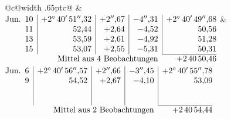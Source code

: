 \noindent\begin{tabular}{@{}c@{\hspace{.4em}\vrule width .65pt\hspace{.4em}}c@{}}
 &
 \\[.18ex]
\(\begin{array}[t]{@{}r|r|r|r|r@{}}
\text{Jun.}\enspace 10 & +2^\circ\,40'\,51''{,}32 & +2''{,}67 & -4''{,}31 & +2^\circ\,40'\,49''{,}68\\
11 & 52{,}44 & +2{,}64 & -4{,}52 & 50{,}56\\
13 & 53{,}59 & +2{,}61 & -4{,}92 & 51{,}28\\
15 & 53{,}07 & +2{,}55 & -5{,}31 & 50{,}31\\
\cline{5-5}
\multicolumn{4}{r}{\text{Mittel aus 4 Beobachtungen}} & +2\,40\,50{,}46
\end{array}\)
&
\(\begin{array}[t]{@{}r|r|r|r|r@{}}
\text{Jun.}\enspace 6 & +2^\circ\,40'\,56''{,}57 & +2''{,}66 & -3''{,}45 & +2^\circ\,40'\,55''{,}78\\
9 & 54{,}52 & +2{,}67 & -4{,}10 & 53{,}09\\
 & & & & \\
 & & & & \\
\cline{5-5}
\multicolumn{4}{r}{\text{Mittel aus 2 Beobachtungen}} & +2\,40\,54{,}44
\end{array}\)
\end{tabular}\par\medskip
{}

